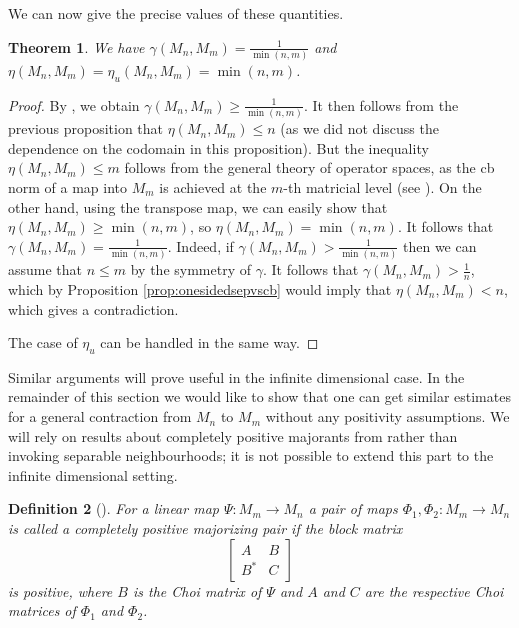 \documentclass[11pt]{article}
\newtheorem{theorem}{Theorem}
\numberwithin{theorem}{section}
\newtheorem{definition}[theorem]{Definition}
\begin{document}
We can now give the precise values of these quantities.
\begin{theorem}\label{thm:gammaandetacomputation}
We have $\gamma(M_n, M_{m}) = \frac{1}{\min(n,m)}$ and $\eta(M_n, M_m) = \eta_{u}(M_n, M_m) = \min(n,m)$.
\end{theorem}
\begin{proof}
By \cite[Corollary 8.4]{Ando}, we obtain $\gamma(M_{n}, M_{m}) \geqslant \frac{1}{\min(n,m)}$. It then follows from the previous proposition that $\eta(M_n, M_m) \leqslant n$ (as we did not discuss the dependence on the codomain in this proposition). But the inequality $\eta(M_{n}, M_m) \leqslant m$ follows from the general theory of operator spaces, as the cb norm of a map into $M_m$ is achieved at the $m$-th matricial level (see \cite[Exercise 3.10, Exercise 3.11]{paulsen-book}). On the other hand, using the transpose map, we can easily show that $\eta(M_n, M_m) \geqslant \min(n,m)$, so $\eta(M_n, M_m) = \min(n,m)$. It follows that $\gamma(M_{n}, M_{m}) = \frac{1}{\min(n,m)}$. Indeed, if $\gamma(M_{n}, M_{m}) > \frac{1}{\min(n,m)}$ then we can assume that $n \leqslant m$ by the symmetry of $\gamma$. It follows that $\gamma(M_n, M_m) > \frac{1}{n}$, which by Proposition \ref{prop:onesidedsepvscb} would imply that $\eta(M_n, M_m) < n$, which gives a contradiction.

The case of $\eta_{u}$ can be handled in the same way.
\end{proof}

Similar arguments will prove useful in the infinite dimensional case. In the remainder of this section we would like to show that one can get similar estimates for a general contraction from $M_n$ to $M_m$ without any positivity assumptions. We will rely on results about completely positive majorants from \cite{Ando} rather than invoking separable neighbourhoods; it is not possible to extend this part to the infinite dimensional setting.
\begin{definition}[{\cite[Section 5]{Ando}}]
  For a linear map $\Psi: M_m \to M_n$ a pair of  maps $\Phi_1, \Phi_2: M_m \to M_n$ is called a completely positive majorizing pair if the block matrix 
\[
\left[\begin{array}{cc} A & B \\ B^{\ast} & C \end{array}\right]
\]
is positive, where $B$ is the Choi matrix of $\Psi$ and $A$ and $C$ are the respective Choi matrices of $\Phi_1$ and $\Phi_2$.  
\end{definition}
\end{document}
